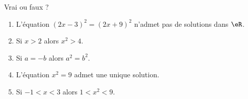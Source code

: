 
\begin{exercice}\label{exosmath-0652}

    Vrai ou faux ?
    \begin{enumerate}
        \item
            L'équation \( (2x-3)^2=(2x+9)^2\) n'admet pas de solutions dans \( \eR\).
        \item
            Si \( x>2\) alors \( x^2>4\).
        \item
            Si \( a=-b\) alors \( a^2=b^2\).
        \item
            L'équation \( x^2=9\) admet une unique solution.
        \item
            Si \( -1<x<3\) alors \( 1<x^2<9\).
    \end{enumerate}

\end{exercice}
